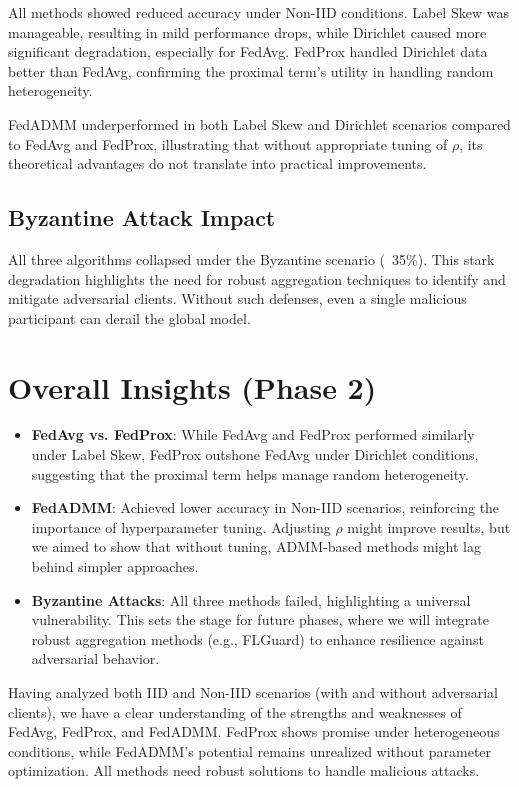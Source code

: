 \documentclass[12pt,a4paper]{report}
\begin{document}
All methods showed reduced accuracy under Non-IID conditions. Label Skew was manageable, resulting in mild performance drops, while Dirichlet caused more significant degradation, especially for FedAvg. FedProx handled Dirichlet data better than FedAvg, confirming the proximal term’s utility in handling random heterogeneity.

FedADMM underperformed in both Label Skew and Dirichlet scenarios compared to FedAvg and FedProx, illustrating that without appropriate tuning of $\rho$, its theoretical advantages do not translate into practical improvements.

\subsection*{Byzantine Attack Impact}

All three algorithms collapsed under the Byzantine scenario (~35\%). This stark degradation highlights the need for robust aggregation techniques to identify and mitigate adversarial clients. Without such defenses, even a single malicious participant can derail the global model.

\section{Overall Insights (Phase 2)}

\begin{itemize}
	\item \textbf{FedAvg vs. FedProx}: While FedAvg and FedProx performed similarly under Label Skew, FedProx outshone FedAvg under Dirichlet conditions, suggesting that the proximal term helps manage random heterogeneity.
	\item \textbf{FedADMM}: Achieved lower accuracy in Non-IID scenarios, reinforcing the importance of hyperparameter tuning. Adjusting $\rho$ might improve results, but we aimed to show that without tuning, ADMM-based methods might lag behind simpler approaches.
	\item \textbf{Byzantine Attacks}: All three methods failed, highlighting a universal vulnerability. This sets the stage for future phases, where we will integrate robust aggregation methods (e.g., FLGuard) to enhance resilience against adversarial behavior.
\end{itemize}

Having analyzed both IID and Non-IID scenarios (with and without adversarial clients), we have a clear understanding of the strengths and weaknesses of FedAvg, FedProx, and FedADMM. FedProx shows promise under heterogeneous conditions, while FedADMM’s potential remains unrealized without parameter optimization. All methods need robust solutions to handle malicious attacks.
\end{document}
